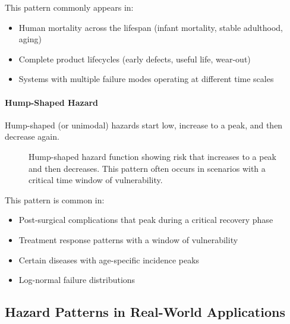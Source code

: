 This pattern commonly appears in:
\begin{itemize}
    \item Human mortality across the lifespan (infant mortality, stable adulthood, aging)
    \item Complete product lifecycles (early defects, useful life, wear-out)
    \item Systems with multiple failure modes operating at different time scales
\end{itemize}

\paragraph{Hump-Shaped Hazard}

Hump-shaped (or unimodal) hazards start low, increase to a peak, and then decrease again.

\begin{figure}[htbp]
    \centering
    \caption{Hump-shaped hazard function showing risk that increases to a peak and then decreases. This pattern often occurs in scenarios with a critical time window of vulnerability.}
    \label{fig:hump-hazard}
\end{figure}

This pattern is common in:
\begin{itemize}
    \item Post-surgical complications that peak during a critical recovery phase
    \item Treatment response patterns with a window of vulnerability
    \item Certain diseases with age-specific incidence peaks
    \item Log-normal failure distributions
\end{itemize}

\subsection{Hazard Patterns in Real-World Applications}

